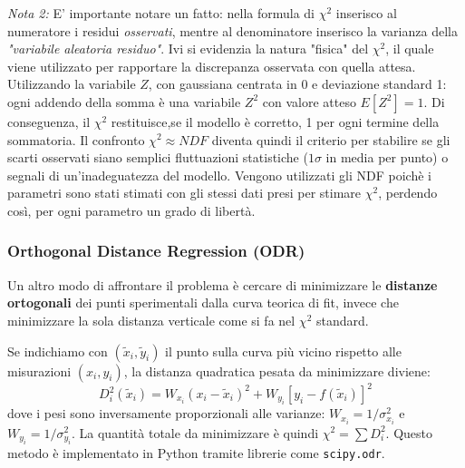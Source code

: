 \documentclass[openany,a4paper,12pt]{book}
\theoremstyle{remark}
\begin{document}
\textit{Nota 2:} E' importante notare un fatto: nella formula di $\chi^2$ inserisco al numeratore i residui \textit{osservati}, 
mentre al denominatore inserisco la varianza della \textit{"variabile aleatoria residuo"}. 
Ivi si evidenzia la natura "fisica" del $\chi^2$, il quale viene utilizzato per rapportare la discrepanza osservata con quella attesa.
Utilizzando la variabile $Z$, con gaussiana centrata in 0 e deviazione standard 1: ogni addendo della somma è una variabile $Z^2$ con valore atteso $E[Z^2]=1$. 
Di conseguenza, il $\chi^2$ restituisce,se il modello è corretto, 1 per ogni termine della sommatoria. Il confronto $\chi^2 \approx NDF$ diventa quindi il criterio per stabilire se gli scarti osservati
siano semplici fluttuazioni statistiche ($1\sigma$ in media per punto) o segnali di un'inadeguatezza del modello.
Vengono utilizzati gli NDF poichè i parametri sono stati stimati con gli stessi dati presi per stimare $\chi^2$, perdendo così, per ogni parametro un grado di libertà.
\subsubsection*{Orthogonal Distance Regression (ODR)}
Un altro modo di affrontare il problema è cercare di minimizzare le \textbf{distanze ortogonali} dei punti sperimentali dalla curva teorica di fit, invece che minimizzare la sola distanza verticale come si fa nel $\chi^2$ standard.

\begin{center}
\end{center}

Se indichiamo con $(\tilde{x}_i, \tilde{y}_i)$ il punto sulla curva più vicino rispetto alle misurazioni $(x_i, y_i)$, la distanza quadratica pesata da minimizzare diviene:
\begin{equation}
    D_i^2(\tilde{x}_i) = W_{x_i}(x_i - \tilde{x}_i)^2 + W_{y_i}[y_i - f(\tilde{x}_i)]^2
\end{equation}
dove i pesi sono inversamente proporzionali alle varianze: $W_{x_i} = 1/\sigma_{x_i}^2$ e $W_{y_i} = 1/\sigma_{y_i}^2$. La quantità totale da minimizzare è quindi $\chi^2 = \sum D_i^2$. Questo metodo è implementato in Python tramite librerie come \texttt{scipy.odr}.
\end{document}
